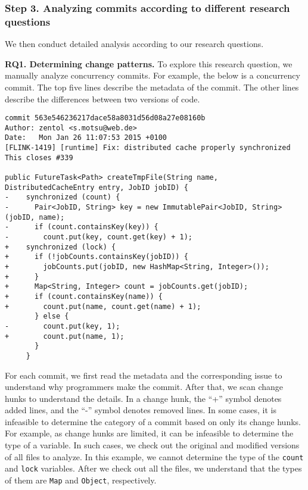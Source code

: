\subsubsection{Step 3. Analyzing commits according to different research questions} We then conduct detailed analysis according to our research questions.



\textbf{RQ1. Determining change patterns.} To explore this research question, we manually analyze concurrency commits. For example, the below is a concurrency commit. The top five lines describe the metadata of the commit. The other lines describe the differences between two versions of code.

\begin{lstlisting}
commit 563e546236217dace58a8031d56d08a27e08160b
Author: zentol <s.motsu@web.de>
Date:   Mon Jan 26 11:07:53 2015 +0100
[FLINK-1419] [runtime] Fix: distributed cache properly synchronized
This closes #339

public FutureTask<Path> createTmpFile(String name, DistributedCacheEntry entry, JobID jobID) {
-    synchronized (count) {
-      Pair<JobID, String> key = new ImmutablePair<JobID, String>(jobID, name);
-      if (count.containsKey(key)) {
-        count.put(key, count.get(key) + 1);
+    synchronized (lock) {
+      if (!jobCounts.containsKey(jobID)) {
+        jobCounts.put(jobID, new HashMap<String, Integer>());
+      }
+      Map<String, Integer> count = jobCounts.get(jobID);
+      if (count.containsKey(name)) {
+        count.put(name, count.get(name) + 1);
       } else {
-        count.put(key, 1);
+        count.put(name, 1);
       }
     }
\end{lstlisting}

For each commit, we first read the metadata and the corresponding issue to understand why programmers make the commit. After that, we scan change hunks to understand the details. In a change hunk, the ``+'' symbol denotes added lines, and the ``-'' symbol denotes removed lines. In some cases, it is infeasible to determine the category of a commit based on only its change hunks. For example, as change hunks are limited, it can be infeasible to determine the type of a variable. In such cases, we check out the original and modified versions of all files to analyze. In this example, we cannot determine the type of the \texttt{count} and \texttt{lock} variables. After we check out all the files, we understand that the types of them are \texttt{Map} and \texttt{Object}, respectively.


